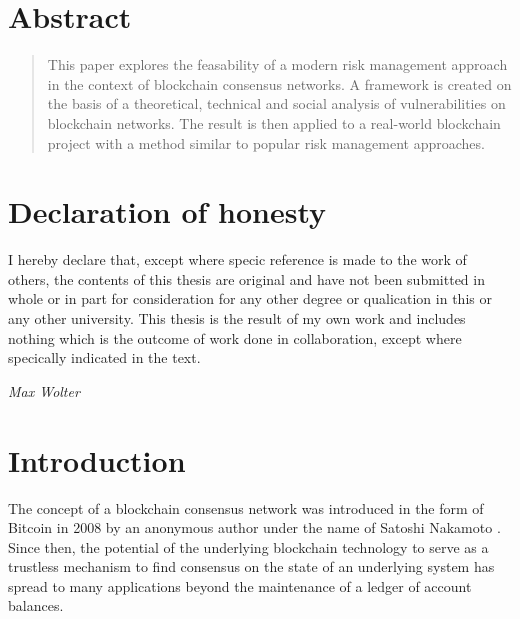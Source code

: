 \documentclass[12pt,a4paper]{article}
\begin{document}
\newpage

\vspace{4cm}

\section*{Abstract}

\begin{abstract}
  This paper explores the feasability of a modern risk management approach in the context of blockchain consensus networks. A framework is created on the basis of a theoretical, technical and social analysis of vulnerabilities on blockchain networks. The result is then applied to a real-world blockchain project with a method similar to popular risk management approaches.
\end{abstract}

\newpage

\section*{Declaration of honesty}

I hereby declare that, except where specic reference is made to the work of others, the contents of this thesis are original and have not been submitted in whole or in part for consideration for any other degree or qualication in this or any other university. This thesis is the result of my own work and includes nothing which is the outcome of work done in collaboration, except where specically indicated in the text.\\
\vspace{4cm}
\begin{displayquote}
  \textit{Max Wolter}
\end{displayquote}

\newpage

\onehalfspacing
\tableofcontents
\singlespacing
\newpage

\section{Introduction}

The concept of a blockchain consensus network was introduced in the form of Bitcoin in 2008 by an anonymous author under the name of Satoshi Nakamoto \cite{bitcoin}. Since then, the potential of the underlying blockchain technology to serve as a trustless mechanism to find consensus on the state of an underlying system has spread to many applications beyond the maintenance of a ledger of account balances.\\
\end{document}
